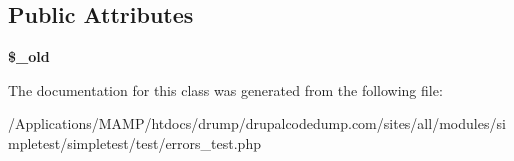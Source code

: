 \subsection*{Public Attributes}
\begin{DoxyCompactItemize}
\item 
\hypertarget{class_test_of_error_trap_ad2d3e8305cec428a46e41eea105f1011}{
{\bfseries \$\_\-old}}
\label{class_test_of_error_trap_ad2d3e8305cec428a46e41eea105f1011}

\end{DoxyCompactItemize}


The documentation for this class was generated from the following file:\begin{DoxyCompactItemize}
\item 
/Applications/MAMP/htdocs/drump/drupalcodedump.com/sites/all/modules/simpletest/simpletest/test/errors\_\-test.php\end{DoxyCompactItemize}

